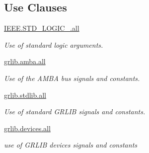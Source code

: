 \subsection*{Use Clauses}
 \begin{DoxyCompactItemize}
\item 
\hypertarget{classdummyapb_a68c233289eaf7d2601307bdd93b4c299}{\hyperlink{classdummyapb_a68c233289eaf7d2601307bdd93b4c299}{I\-E\-E\-E.\-S\-T\-D\-\_\-\-L\-O\-G\-I\-C\-\_.\-all}   }\label{classdummyapb_a68c233289eaf7d2601307bdd93b4c299}

\begin{DoxyCompactList}\small\item\em Use of standard logic arguments. \end{DoxyCompactList}\item 
\hypertarget{classdummyapb_a543ad46b77c6dc7048df8e72163d311d}{\hyperlink{classdummyapb_a543ad46b77c6dc7048df8e72163d311d}{grlib.\-amba.\-all}   }\label{classdummyapb_a543ad46b77c6dc7048df8e72163d311d}

\begin{DoxyCompactList}\small\item\em Use of the A\-M\-B\-A bus signals and constants. \end{DoxyCompactList}\item 
\hypertarget{classdummyapb_a8290b68c465332cd784781f7230e772d}{\hyperlink{classdummyapb_a8290b68c465332cd784781f7230e772d}{grlib.\-stdlib.\-all}   }\label{classdummyapb_a8290b68c465332cd784781f7230e772d}

\begin{DoxyCompactList}\small\item\em Use of standard G\-R\-L\-I\-B signals and constants. \end{DoxyCompactList}\item 
\hypertarget{classdummyapb_ad24672e694b1bed181a8b2813b132538}{\hyperlink{classdummyapb_ad24672e694b1bed181a8b2813b132538}{grlib.\-devices.\-all}   }\label{classdummyapb_ad24672e694b1bed181a8b2813b132538}

\begin{DoxyCompactList}\small\item\em use of G\-R\-L\-I\-B devices signals and constants \end{DoxyCompactList}\end{DoxyCompactItemize}

